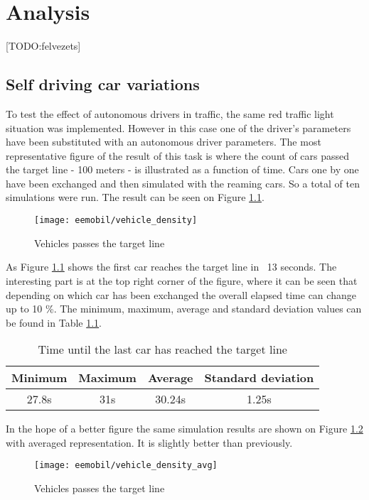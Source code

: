 \chapter{Analysis}
	[TODO:felvezets]
	\section{Self driving car variations}
		To test the effect of autonomous drivers in traffic, the same red traffic light situation was implemented. However in this case one of the driver's parameters have been substituted with an autonomous driver parameters. The most representative figure of the result of this task is where the count of cars passed the target line - 100 meters - is illustrated as a function of time. Cars one by one have been exchanged and then simulated with the reaming cars. So a total of ten simulations were run. The result can be seen on Figure \ref{fig:vehicle_density}.
		\begin{figure}[ht]
			\centering
			\texttt{[image: eemobil/vehicle\_density]}
			\caption{Vehicles passes the target line}
			\label{fig:vehicle_density}
		\end{figure}

		As Figure \ref{fig:vehicle_density} shows the first car reaches the target line in ~13 seconds. The interesting part is at the top right corner of the figure, where it can be seen that depending on which car has been exchanged the overall elapsed time can change up to 10 \%. The minimum, maximum, average and standard deviation values can be found in Table \ref{tab:vehicle_density_minmaxavg}.
		\begin{table}[ht]
			\begin{center}
				\begin{tabular}{ |c|c|c|c|}
					\hline
					Minimum& Maximum & Average& Standard deviation\\
					\hline
					27.8s&31s&30.24s&1.25s\\
					\hline
				\end{tabular}
			\end{center}
			\caption{Time until the last car has reached the target line}
			\label{tab:vehicle_density_minmaxavg}
		\end{table}
		
		In the hope of a better figure the same simulation results are shown on Figure \ref{fig:vehicle_density_avg} with averaged representation. It is slightly better than previously.
		\begin{figure}[ht]
			\centering
			\texttt{[image: eemobil/vehicle\_density\_avg]}
			\caption{Vehicles passes the target line}
			\label{fig:vehicle_density_avg}
		\end{figure}
		
